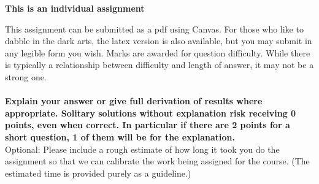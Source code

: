 \documentclass[9pt, addpoints]{exam}
\begin{document}
\large     
\vspace{2cm}
\begin{center}
    \begin{minipage}{40em}
        \vspace{6pt}
        \begin{center}
            \textbf{This is an individual assignment}
        \end{center}
        \vspace{6pt}

    This assignment can be submitted as a pdf using 
    Canvas.  For those who like to dabble in the dark arts, the latex version 
    is also available, but you may submit in any legible form you wish.
        Marks are awarded for question difficulty. While there is 
        typically a relationship between difficulty and length of answer,
        it may not be a strong one. 
        \\
        \\
        \textbf{Explain your answer or give full derivation
        of results where appropriate. Solitary solutions without explanation
        risk receiving 0 points, even when correct. 
        In particular if there are
        2 points for a short question, 1 of them will be for the explanation.}
        \vspace{12pt}
        \\
        Optional: Please include a rough estimate of how long it took you do the 
        assignment so that we can calibrate the work being assigned for the 
        course. (The estimated time is provided purely as a guideline.)
        \par
        \vspace{12pt}
    \end{minipage}
\end{center}

\vspace{4cm}

\begin{center}
    \gradetable[h]
\end{center}
\newpage

\end{document}
